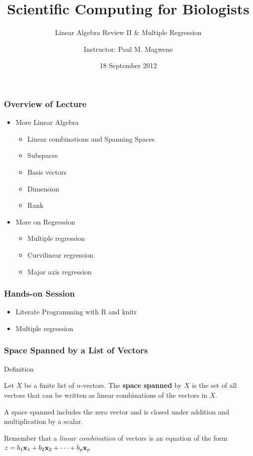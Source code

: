 \documentclass{beamer}
\title{Scientific Computing for Biologists}
\subtitle{Linear Algebra Review II \& Multiple Regression} %
\author{Instructor: Paul M. Magwene}
\date{18 September 2012}
\begin{document}
\begin{frame}
\titlepage
\end{frame}

\begin{frame}
  \frametitle{Overview of Lecture}

\begin{itemize}
		\item More Linear Algebra
		\begin{itemize}
			\item Linear combinations and Spanning Spaces
			\item Subspaces
			\item Basis vectors
			\item Dimension
			\item Rank
		\end{itemize}
		\item More on Regression
		\begin{itemize}
		  \item Multiple regression
		  \item Curvilinear regression
		  \item Major axis regression
		\end{itemize}
\end{itemize}

\end{frame}

\begin{frame}
  \frametitle{Hands-on Session}
\begin{itemize}
    \item Literate Programming with R and knitr
    \item Multiple regression
\end{itemize}


\end{frame}





\begin{frame}
  \frametitle{Space Spanned by a List of Vectors}


\begin{block}{Definition}

Let $X$ be a finite list of $n$-vectors. The \textbf{space spanned} by $X$ is the set of all vectors that can be written as linear combinations of the vectors in $X$.
\medskip

A space spanned includes the zero vector and is closed under addition and multiplication by a scalar.

\end{block}
\bigskip

Remember that a \emph{linear combination} of vectors is an equation of the form $z = b_1 \mathbf{x}_1 + b_2 \mathbf{x}_2 + \cdots + b_p \mathbf{x}_p$

\end{frame}
\end{document}
